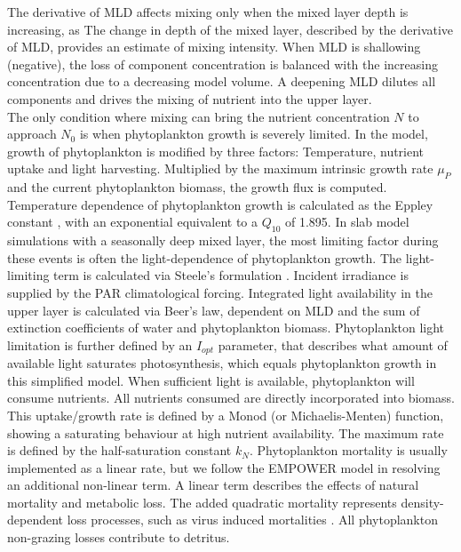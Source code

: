 \documentclass[template.tex]{subfiles}
\begin{document}
The derivative of MLD affects mixing only when the mixed layer depth is increasing, as 
The change in depth of the mixed layer, described by the derivative of MLD, provides an estimate of mixing intensity. When MLD is shallowing (negative), the loss of component concentration is balanced with the increasing concentration due to a decreasing model volume. A deepening MLD dilutes all components and drives the mixing of nutrient into the upper layer. \\

The only condition where mixing can bring the nutrient concentration $N$ to approach $N_0$ is when phytoplankton growth is severely limited. In the model, growth of phytoplankton is modified by three factors: Temperature, nutrient uptake and light harvesting. Multiplied by the maximum intrinsic growth rate $\mu_P$ and the current phytoplankton biomass, the growth flux is computed. Temperature dependence of phytoplankton growth is calculated as the Eppley constant \citep{Eppley1972TemperatureSea}, with an exponential equivalent to a $Q_{10}$ of 1.895.
In slab model simulations with a seasonally deep mixed layer, the most limiting factor during these events is often the light-dependence of phytoplankton growth. The light-limiting term is calculated via Steele's formulation \citep{Steele1962EnvironmentalSea}. Incident irradiance is supplied by the PAR climatological forcing. Integrated light availability in the upper layer is calculated via Beer's law, dependent on MLD and the sum of extinction coefficients of water and phytoplankton biomass. Phytoplankton light limitation is further defined by an $I_{opt}$ parameter, that describes what amount of available light saturates photosynthesis, which equals phytoplankton growth in this simplified model.
When sufficient light is available, phytoplankton will consume nutrients. All nutrients consumed are directly incorporated into biomass. This uptake/growth rate is defined by a Monod (or Michaelis-Menten) function, showing a saturating behaviour at high nutrient availability. The maximum rate is defined by the half-saturation constant $k_N$. 
Phytoplankton mortality is usually implemented as a linear rate, but we follow the EMPOWER model in resolving an additional non-linear term. A linear term describes the effects of natural mortality and metabolic loss. The added quadratic mortality represents density-dependent loss processes, such as virus induced mortalities \citep{Anderson2015c}.  
All phytoplankton non-grazing losses contribute to detritus.\\
\end{document}
